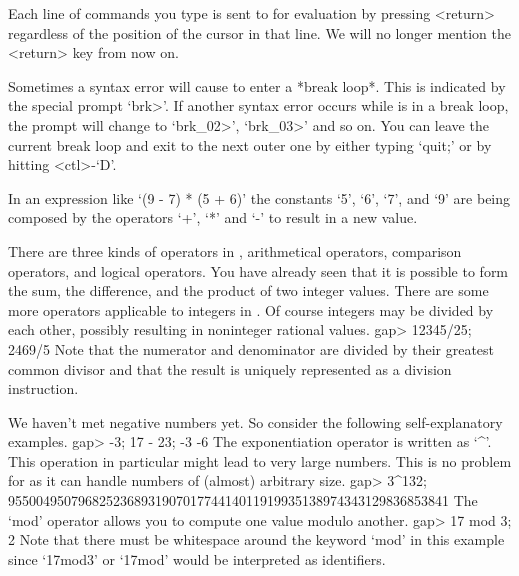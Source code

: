Each line  of commands  you  type is sent to    {\GAP} for evaluation  by
pressing <return> regardless of the position of  the cursor in that line.
We will no longer mention the <return> key from now on.

%
Sometimes a syntax error will cause {\GAP} to enter a *break loop*.  This
is indicated by the special prompt `brk>'. If another syntax error occurs
while  {\GAP} is in  a break loop, the prompt  will  change to `brk_02>',
`brk_03>' and so on. You can leave the current break loop and exit to the
next outer one by either typing `quit;' or by hitting <ctl>-`D'.

\null

%
In an  expression like `(9  - 7) * (5 +  6)' the constants `5', `6', `7',
and `9' are being composed by the operators `+', `*' and `-' to result in
a new value.

There are  three kinds  of operators in  {\GAP}, arithmetical  operators,
comparison operators, and logical operators.  You  have already seen that
it is possible to form  the sum,  the  difference, and the product of two
integer values.  There are some  more operators applicable to integers in
{\GAP}.   Of  course integers  may  be divided  by  each other,  possibly
resulting in noninteger rational values.
\beginexample
    gap> 12345/25;
    2469/5 
\endexample
Note  that  the numerator and denominator  are divided by their  greatest
common divisor  and that the result is uniquely represented as a division
instruction.

We     haven't met negative numbers      yet.  So consider the  following
self-explanatory examples.
\beginexample
    gap> -3; 17 - 23;
    -3
    -6 
\endexample
The exponentiation   operator  is  written  as  `^'. This   operation  in
particular might lead  to  very large numbers.  This  is  no problem  for
{\GAP} as it can handle numbers of (almost) arbitrary size.
\beginexample
    gap> 3^132;
    955004950796825236893190701774414011919935138974343129836853841 
\endexample
The `mod' operator allows you to compute one value modulo another.
\beginexample
    gap> 17 mod 3;
    2 
\endexample
Note  that  there must be   whitespace around the  keyword  `mod' in this
example since `17mod3' or `17mod' would be interpreted as identifiers.

